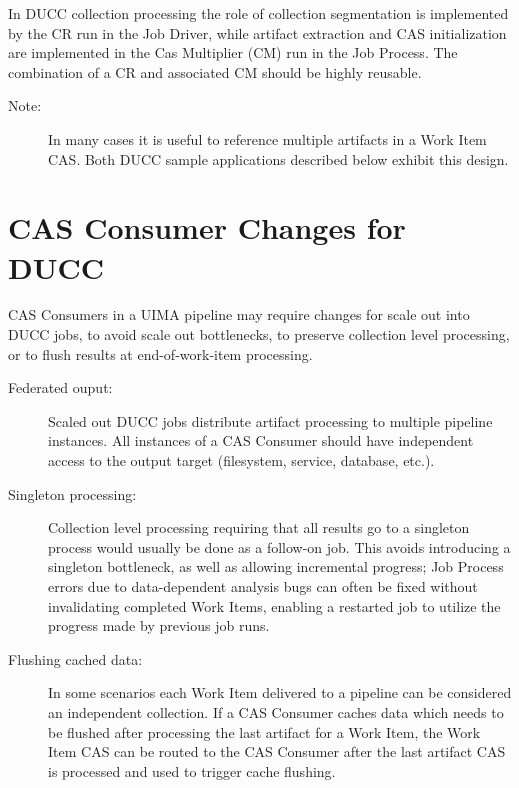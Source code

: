 In DUCC collection processing the role of collection segmentation is
implemented by the CR run in the Job Driver, while
artifact extraction and CAS initialization are implemented in the Cas Multiplier
(CM) run in the Job Process. The combination of a CR and associated CM 
should be highly reusable. 

\begin{description}
    \item[Note:] In many cases it is useful to reference multiple artifacts in a
      Work Item CAS. Both DUCC sample applications described below exhibit this design.
\end{description}

\section{CAS Consumer Changes for DUCC}

CAS Consumers in a UIMA pipeline may require changes for scale out into DUCC
jobs, to avoid scale out bottlenecks, to preserve collection level
processing, or to flush results at end-of-work-item processing.
   
	\begin{description}
	    \item[Federated ouput:] Scaled out DUCC jobs distribute artifact processing
	    to multiple pipeline instances. All instances of a CAS Consumer should have
	    independent access to the output target (filesystem, service, database, etc.).
	    \item[Singleton processing:] Collection level processing
	    requiring that all results go to a singleton process would usually be done as a 
            follow-on job.
	    This avoids introducing a singleton bottleneck, as well as allowing
	    incremental progress; Job Process errors due to data-dependent analysis bugs
	    can often be fixed without invalidating completed Work Items, 
            enabling a restarted job to utilize the progress made by
	    previous job runs.
	    \item[Flushing cached data:] In some scenarios each Work Item delivered to a
	    pipeline can be considered an independent collection. If a CAS Consumer
	    caches data which needs to be flushed after processing the
	    last artifact for a Work Item, the Work Item CAS can be routed to the CAS Consumer after
	    the last artifact CAS is processed and used to trigger cache flushing.
	\end{description}


